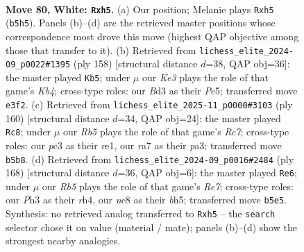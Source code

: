 \documentclass[11pt]{article}
\begin{document}
\clearpage

\begin{figure}[p]\centering
\begin{subfigure}{0.46\textwidth}\centering
\resizebox{\linewidth}{!}{%
\newchessgame
\chessboard[
  setfen={2n5/r7/P1k5/1R5p/8/2pBK1PP/2P5/8 w - - 0 80},
  showmover=false,
  pgfstyle=straightmove, color=movearrow, markmove={b5-h5}
]}
\caption{}
\end{subfigure}\hfill
\begin{subfigure}{0.46\textwidth}\centering
\resizebox{\linewidth}{!}{%
\newchessgame
\chessboard[
  setfen={r7/4k1p1/P2R3p/4P2P/1K4P1/8/3p4/8 w - - 0 80},
  showmover=false,
  pgfstyle=straightmove, color=movearrow, markmove={b4-b5}
]}
\caption{}
\end{subfigure}
\\[4pt]
\begin{subfigure}{0.46\textwidth}\centering
\resizebox{\linewidth}{!}{%
\newchessgame
\chessboard[
  setfen={8/2RP4/1k3b2/8/1p2PB2/pP3K2/8/4r3 w - - 5 81},
  showmover=false,
  pgfstyle=straightmove, color=movearrow, markmove={c7-c8}
]}
\caption{}
\end{subfigure}\hfill
\begin{subfigure}{0.46\textwidth}\centering
\resizebox{\linewidth}{!}{%
\newchessgame
\chessboard[
  setfen={8/4R3/5p2/2Bp3b/p2P3r/P2k4/6K1/8 w - - 64 85},
  showmover=false,
  pgfstyle=straightmove, color=movearrow, markmove={e7-e6}
]}
\caption{}
\end{subfigure}
\caption{\textbf{Move 80, White: \texttt{Rxh5}.} (a) Our position; Melanie plays \texttt{Rxh5} (\texttt{b5h5}). Panels (b)--(d) are the retrieved master positions whose correspondence most drove this move (highest QAP objective among those that transfer to it). (b) Retrieved from \texttt{lichess\_elite\_2024-09\_p0022\#1395} (ply 158) [structural distance $d$=38, QAP obj=36]: the master played \texttt{Kb5}; under $\mu$ our \emph{Ke3} plays the role of that game's \emph{Kb4}; cross-type roles: our \emph{B}d3 as their \emph{P}e5; transferred move \texttt{e3f2}. (c) Retrieved from \texttt{lichess\_elite\_2025-11\_p0000\#3103} (ply 160) [structural distance $d$=34, QAP obj=24]: the master played \texttt{Rc8}; under $\mu$ our \emph{Rb5} plays the role of that game's \emph{Rc7}; cross-type roles: our \emph{p}c3 as their \emph{r}e1, our \emph{r}a7 as their \emph{p}a3; transferred move \texttt{b5b8}. (d) Retrieved from \texttt{lichess\_elite\_2024-09\_p0016\#2484} (ply 168) [structural distance $d$=36, QAP obj=6]: the master played \texttt{Re6}; under $\mu$ our \emph{Rb5} plays the role of that game's \emph{Re7}; cross-type roles: our \emph{P}h3 as their \emph{r}h4, our \emph{n}c8 as their \emph{b}h5; transferred move \texttt{b5e5}. Synthesis: no retrieved analog transferred to \texttt{Rxh5} -- the \texttt{search} selector chose it on value (material / mate); panels (b)--(d) show the strongest nearby analogies.}
\label{fig:thought-m158}
\end{figure}
\end{document}
